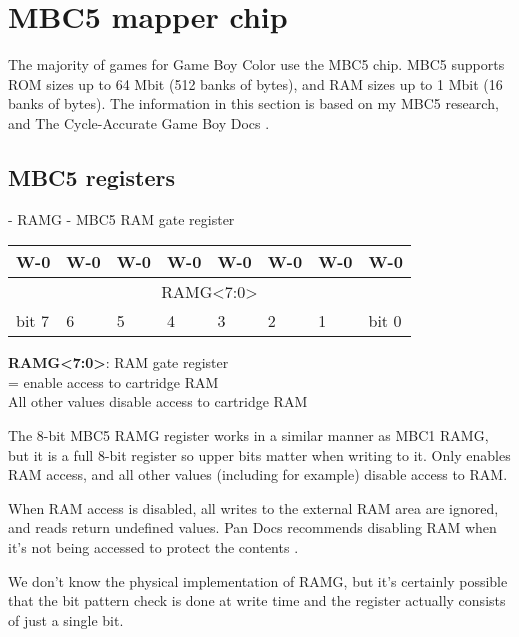 \chapter{MBC5 mapper chip}

The majority of games for Game Boy Color use the MBC5 chip. MBC5 supports ROM
sizes up to 64 Mbit (512 banks of  bytes), and RAM sizes up to 1 Mbit
(16 banks of  bytes). The information in this section is based on my
MBC5 research, and The Cycle-Accurate Game Boy Docs \cite{tcagbd}.

\section{MBC5 registers}

\begin{register}[H]
  \caption{ - RAMG - MBC5 RAM gate register}
  {
    \ttfamily
    \begin{tabularx}{\textwidth}{|X|X|X|X|X|X|X|X|}
      \hline
      W-0 & W-0 & W-0 & W-0 & W-0 & W-0 & W-0 & W-0 \\
      \hline
      \multicolumn{8}{|c|}{RAMG<7:0>} \\
      \hline
      bit 7 & 6 & 5 & 4 & 3 & 2 & 1 & bit 0 \\
      \hline
    \end{tabularx}
  }

  \begin{description}[leftmargin=5em, style=nextline]
    \item[bit 7-0]
      \textbf{RAMG<7:0>}: RAM gate register \\
      = enable access to cartridge RAM \\
      All other values disable access to cartridge RAM
  \end{description}
\end{register}

The 8-bit MBC5 RAMG register works in a similar manner as MBC1 RAMG, but it is
a full 8-bit register so upper bits matter when writing to it. Only
 enables RAM access, and all other values (including
 for example) disable access to RAM.

When RAM access is disabled, all writes to the external RAM area
 are ignored, and reads return undefined values. Pan Docs
recommends disabling RAM when it's not being accessed to protect the contents
\cite{pandocs}.

\begin{speculation}
  We don't know the physical implementation of RAMG, but it's certainly
  possible that the  bit pattern check is done at write time and the
  register actually consists of just a single bit.
\end{speculation}

